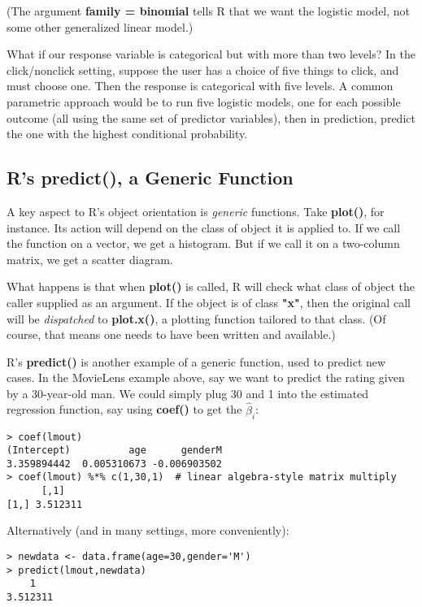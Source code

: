 (The argument \textbf{family = binomial} tells R that we want the
logistic model, not some other generalized linear model.)

What if our response variable is categorical but with more than two
levels?  In the click/nonclick setting, suppose the user has a choice of
five things to click, and must choose one.  Then the response is
categorical with five levels.  A common parametric approach would be to
run five logistic models, one for each possible outcome (all using the
same set of predictor variables), then in prediction, predict the one
with the highest conditional probability.

\subsection{R's predict(), a Generic Function}

A key aspect to R's object orientation is \textit{generic} functions.
Take \textbf{plot()}, for instance.  Its action will depend on the class
of object it is applied to.  If we call the function on a vector, we get
a histogram.  But if we call it on a two-column matrix, we get a scatter
diagram.

What happens is that when \textbf{plot()} is called, R will check what
class of object the caller supplied as an argument.  If the object is of
class \textbf{"x"}, then the original call will be \textit{dispatched}
to \textbf{plot.x()}, a plotting function tailored to that class.  (Of
course, that means one needs to have been written and available.)

R's \textbf{predict()} is another example of a generic function, used to
predict new cases.  In the MovieLens example above, say we want to
predict the rating given by a 30-year-old man.  We could simply plug
30 and 1 into the estimated regression function, say using
\textbf{coef()} to get the $\widehat{\beta}_i$:

\begin{lstlisting}
> coef(lmout)
(Intercept)          age      genderM 
3.359894442  0.005310673 -0.006903502 
> coef(lmout) %*% c(1,30,1)  # linear algebra-style matrix multiply
      [,1]
[1,] 3.512311
\end{lstlisting}

Alternatively (and in many settings, more conveniently):

\begin{lstlisting}
> newdata <- data.frame(age=30,gender='M')
> predict(lmout,newdata)
    1 
3.512311 
\end{lstlisting}

